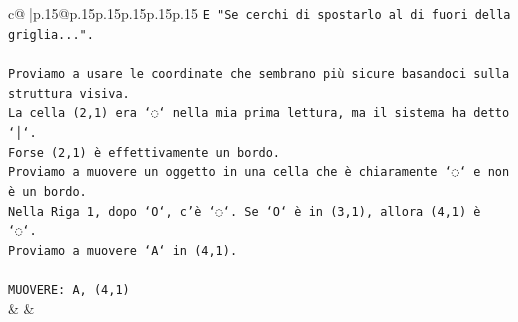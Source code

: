 \documentclass{article}
\begin{document}
{\begin{supertabular}{c@{$\;$}|p{.15\linewidth}@{}p{.15\linewidth}p{.15\linewidth}p{.15\linewidth}p{.15\linewidth}p{.15\linewidth}}
{{{\texttt{E "Se cerchi di spostarlo al di fuori della griglia...".} \\
\\ 
\texttt{Proviamo a usare le coordinate che sembrano più sicure basandoci sulla struttura visiva.} \\
\texttt{La cella (2,1) era `◌` nella mia prima lettura, ma il sistema ha detto `│`.} \\
\texttt{Forse (2,1) è effettivamente un bordo.} \\
\texttt{Proviamo a muovere un oggetto in una cella che è chiaramente `◌` e non è un bordo.} \\
\texttt{Nella Riga 1, dopo `O`, c'è `◌`. Se `O` è in (3,1), allora (4,1) è `◌`.} \\
\texttt{Proviamo a muovere `A` in (4,1).} \\
\\ 
\texttt{MUOVERE: A, (4,1)} \\
            }
        }
    }
    & & \\ \\


\end{supertabular}}
\end{document}
